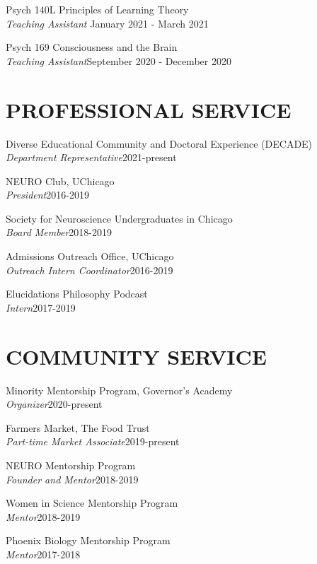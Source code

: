 \documentclass[margin, 10pt]{res} %
\begin{document}
\begin{resume}
Psych 140L Principles of Learning Theory \\ 
{\sl Teaching Assistant} \hfill {January 2021 - March 2021} 

Psych 169 Consciousness and the Brain \\
{\sl Teaching Assistant}\hfill {September 2020 - December 2020} 



\section{PROFESSIONAL SERVICE}

{Diverse Educational Community and Doctoral Experience (DECADE)} \\
{\sl Department Representative}\hfill 2021-present

{NEURO Club, UChicago} \\
{\sl President}\hfill{2016-2019}

{Society for Neuroscience Undergraduates in Chicago} \\
{\sl Board Member}\hfill{2018-2019}

{Admissions Outreach Office, UChicago} \\
{\sl Outreach Intern Coordinator}\hfill{2016-2019}

{Elucidations Philosophy Podcast} \\
{\sl Intern}\hfill{2017-2019}


\section{COMMUNITY SERVICE}


{Minority Mentorship Program, Governor's Academy} \\
{\sl Organizer}\hfill 2020-present

{Farmers Market, The Food Trust} \\
{\sl Part-time Market Associate}\hfill 2019-present

{NEURO Mentorship Program} \\
{\sl Founder and Mentor}\hfill{2018-2019}

{Women in Science Mentorship Program} \\
{\sl Mentor}\hfill{2018-2019}

{Phoenix Biology Mentorship Program} \\
{\sl Mentor}\hfill{2017-2018}


\end{resume}
\end{document}

